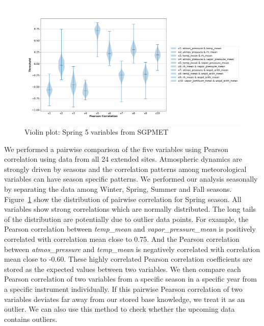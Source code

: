 \begin{figure}[ht]
    \centering
    \includegraphics[width=\textwidth]{figures/Spring.png}
    \caption{Violin plot: Spring 5 variables from SGPMET}
    \label{fig:pc}
\end{figure}

We performed a pairwise comparison of the five variables using Pearson
correlation using data from all 24 extended sites. Atmospheric
dynamics are strongly driven by seasons and the correlation patterns
among meteorological variables can have season specific patterns. We
performed our analysis seasonally by separating the data among Winter, Spring,
Summer and Fall seasons. Figure~\ref{fig:pc} show the distribution of
pairwise correlation for Spring season. All variables show strong
correlations which are normally distributed. The long tails of the
distribution are potentially due to outlier data points. 
For example, the Pearson correlation between
\textit{temp\_mean} and \textit{vapor\_pressure\_mean} is positively
correlated with correlation mean close to 0.75. And the Pearson
correlation between \textit{atmos\_pressure} and \textit{temp\_mean} is
negatively correlated with correlation mean close to -0.60. These highly
correlated Pearson correlation coefficients are stored as the expected
values between two variables. We then compare each Pearson correlation
of two variables from a specific season in a specific year from a
specific instrument individually. If this pairwise Pearson correlation
of two variables deviates far away from our stored base knowledge, we
treat it as an outlier. We can also use this method to check whether the
upcoming data contains outliers.

